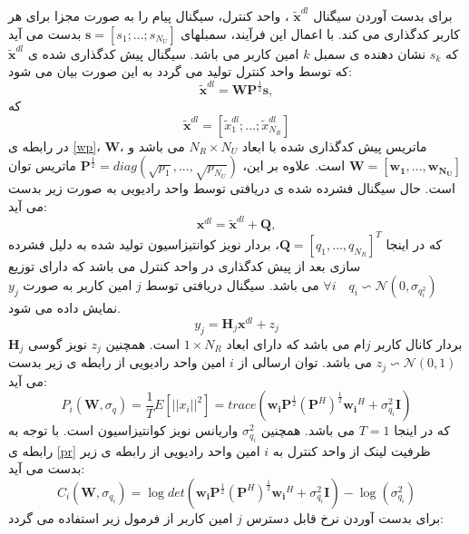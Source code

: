 برای بدست آوردن سیگنال 
$\tilde{\boldsymbol{x}}^{dl}$ ،
واحد کنترل، سیگنال پیام را به صورت مجزا برای هر کاربر کدگذاری می کند.  با  اعمال این فرآیند،  سمبلهای $\boldsymbol{s}=[s_1;...;s_{N_U}]$  بدست می آید که $s_k$ نشان دهنده ی سمبل $k$ امین کاربر می باشد. 
سیگنال پیش کدگذاری شده ی
$\tilde{\boldsymbol{x}}^{dl} $
که توسط واحد کنترل تولید می گردد به این صورت بیان می شود:
\begin{equation}\label{wp}
 \tilde{\boldsymbol{x}}^{dl} = \boldsymbol{W}\boldsymbol{P}^{\frac{1}{2}} \boldsymbol{s},
\end{equation}
که 
 \begin{equation}
\tilde{\boldsymbol{x}}^{dl} = [\tilde{x}_{1}^{dl}; ... ; \tilde{x}_{N_R}^{dl}] 
 \end{equation}
 در رابطه ی  \eqref{wp}، $\boldsymbol{W}$، ماتریس پیش کدگذاری شده با ابعاد $N_R \times N_U$ می باشد و $\boldsymbol{W} = [\boldsymbol{w_1},..., \boldsymbol{w_{N_{U}}}]$ است. علاوه بر این، 
 $\boldsymbol{P}^{\frac{1}{2}} = diag(\sqrt{p_1},...,\sqrt{p_{N_U}})$ 
 ماتریس توان است.
حال سیگنال فشرده شده ی دریافتی توسط واحد رادیویی به صورت زیر بدست می آید:
\begin{equation}
\label{eq_pow1}
 {\boldsymbol{x}}^{dl} = \tilde{\boldsymbol{x}}^{dl} + \boldsymbol{Q},
\end{equation}
که در اینجا $\boldsymbol{Q} = \left[ q_1,\ldots,q_{N_R}\right]^T$، بردار نویز کوانتیزاسیون تولید شده به دلیل فشرده سازی بعد از پیش کدگذاری در واحد کنترل می باشد که دارای توزیع 
 $ \forall i  \quad  q_i\backsim \mathcal{N}(0,\sigma_{q_i^2}) $ 
 می باشد.
سیگنال دریافتی توسط $j$ امین کاربر به صورت $y_j$ نمایش داده می شود.
\begin{equation}
{y}_j = \boldsymbol{H}_j \boldsymbol{x}^{dl}+ z_j
\end{equation}
 $\boldsymbol{H}_j $
  بردار کانال کاربر $j$ام می باشد 
  که دارای ابعاد
 $1 \times N_R$ 
 است. همچنین
    $z_j$ نویز گوسی 
 $z_j \backsim \mathcal{N}(0,1) $ می باشد.
توان ارسالی از $i$ امین واحد رادیویی از رابطه ی زیر بدست می آید:
\begin{equation}\label{pr}
P_i (\boldsymbol{W},\sigma_q) = \frac{1}{T} E[{||{x_i}||}^2] = trace(\boldsymbol{w_i}\boldsymbol{P}^{\frac{1}{2}}(\boldsymbol{P}^H)^{ \frac{1}{2}}\boldsymbol{w_i}^H + \sigma_{q_i}^2 \boldsymbol{I})
\end{equation}
که در اینجا 
$T=1$
 می باشد.
همچنین 
$\sigma_{q_i}^2$
واریانس نویز کوانتیزاسیون است.
با توجه به رابطه ی \eqref{pr}
ظرفیت لینک  از واحد کنترل به  $i$ امین واحد رادیویی 
از رابطه ی زیر بدست می آید:
\begin{equation}
C_i(\boldsymbol{W},\sigma_{q_i}) = \log det(\boldsymbol{w_i}\boldsymbol{P}^{\frac{1}{2}}(\boldsymbol{P}^H)^{ \frac{1}{2}}\boldsymbol{w_i}^H + \sigma_{q_i}^2 \boldsymbol{I}) - \log (\sigma_{q_i}^2)
\end{equation}
برای بدست آوردن نرخ قابل دسترس $j$ امین کاربر از فرمول زیر استفاده می گردد:

